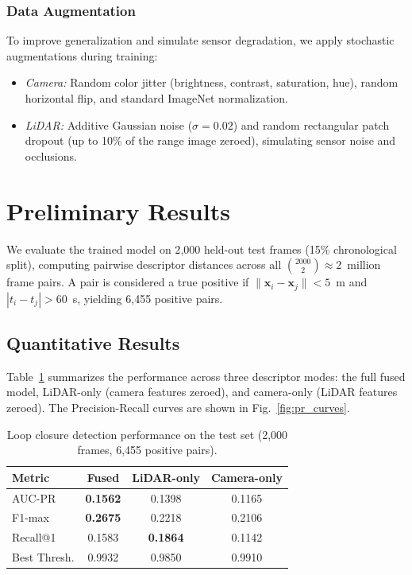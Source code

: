 \subsubsection{Data Augmentation}
To improve generalization and simulate sensor degradation, we apply stochastic augmentations during training:
\begin{itemize}
    \item \emph{Camera:} Random color jitter (brightness, contrast, saturation, hue), random horizontal flip, and standard ImageNet normalization.
    \item \emph{LiDAR:} Additive Gaussian noise ($\sigma{=}0.02$) and random rectangular patch dropout (up to 10\% of the range image zeroed), simulating sensor noise and occlusions.
\end{itemize}

\section{Preliminary Results}
\label{sec:results}

We evaluate the trained model on 2{,}000 held-out test frames (15\% chronological split), computing pairwise descriptor distances across all $\binom{2000}{2} \approx 2$~million frame pairs. A pair is considered a true positive if $\|\mathbf{x}_i - \mathbf{x}_j\| < 5$~m and $|t_i - t_j| > 60$~s, yielding 6{,}455 positive pairs.

\subsection{Quantitative Results}

Table~\ref{tab:results} summarizes the performance across three descriptor modes: the full fused model, LiDAR-only (camera features zeroed), and camera-only (LiDAR features zeroed). The Precision-Recall curves are shown in Fig.~\ref{fig:pr_curves}.

\begin{table}[t]
\centering
\caption{Loop closure detection performance on the test set (2{,}000 frames, 6{,}455 positive pairs).}
\label{tab:results}
\begin{tabular}{lccc}
\toprule
\textbf{Metric} & \textbf{Fused} & \textbf{LiDAR-only} & \textbf{Camera-only} \\
\midrule
AUC-PR       & \textbf{0.1562} & 0.1398 & 0.1165 \\
F1-max       & \textbf{0.2675} & 0.2218 & 0.2106 \\
Recall@1     & 0.1583 & \textbf{0.1864} & 0.1142 \\
Best Thresh. & 0.9932 & 0.9850 & 0.9910 \\
\bottomrule
\end{tabular}
\end{table}

